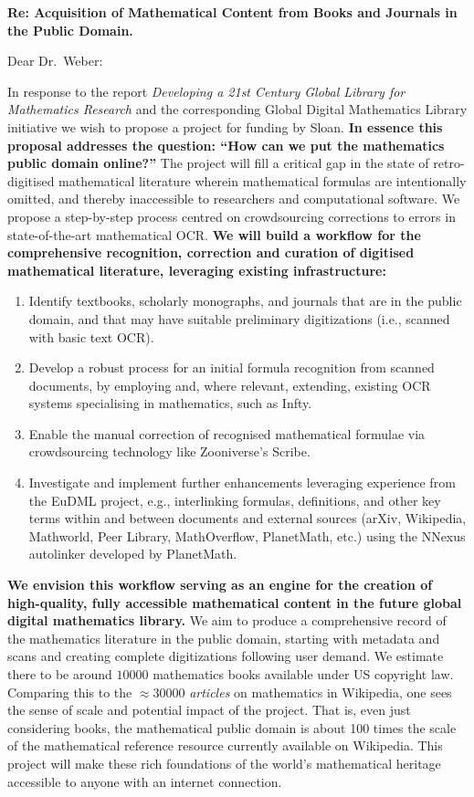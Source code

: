 \documentclass[10pt,letterpaper]{article}
\begin{document}
\thispagestyle{empty}

\noindent\textbf{Re: \quad Acquisition of Mathematical Content from Books and Journals in the Public Domain.}

\bigskip

\noindent Dear Dr.~Weber:

\bigskip

In response to the report \emph{Developing a 21st Century Global
  Library for Mathematics Research} and the corresponding Global
Digital Mathematics Library initiative we wish to propose a project
for funding by Sloan.  \textbf{In essence this proposal addresses the
  question: ``How can we put the mathematics public domain online?''}
The project will fill a critical gap in the state of retro-digitised
mathematical literature wherein mathematical formulas are
intentionally omitted, and thereby inaccessible to researchers and
computational software.  We propose a step-by-step process centred on
crowdsourcing corrections to errors in state-of-the-art mathematical
OCR.  \textbf{We will build a workflow for the comprehensive
  recognition, correction and curation of digitised mathematical
  literature, leveraging existing infrastructure:}
\begin{enumerate}
\item Identify textbooks, scholarly monographs, and journals that are
  in the public domain, and that may have suitable preliminary
  digitizations (i.e., scanned with basic text OCR).
\item Develop a robust process for an initial formula recognition from scanned 
documents, by employing and, where relevant, extending, existing OCR systems 
specialising in mathematics, such as {\sf Infty}.
\item Enable 
the manual correction of recognised mathematical formulae via crowdsourcing 
technology like Zooniverse's {\sf Scribe}.
\item Investigate and implement further enhancements leveraging
  experience from the EuDML project, e.g., interlinking formulas,
  definitions, and other key terms within and between documents and
  external sources (arXiv, Wikipedia, Mathworld, Peer Library,
  MathOverflow, PlanetMath, etc.) using the {\sf NNexus} autolinker
  developed by PlanetMath.
\end{enumerate}
\textbf{We envision this workflow serving as an engine for the
  creation of high-quality, fully accessible mathematical content in
  the future global digital mathematics library.}  We aim to produce a
comprehensive record of the mathematics literature in the public
domain, starting with metadata and scans and creating complete
digitizations following user demand.  We estimate there to be around
$10000$ mathematics books available under US copyright law.  Comparing
this to the $\approx$30000 \emph{articles} on mathematics in
Wikipedia, one sees the sense of scale and potential impact of the
project.  That is, even just considering books, the mathematical
public domain is about 100 times the scale of the mathematical
reference resource currently available on Wikipedia.  This project
will make these rich foundations of the world's mathematical heritage
accessible to anyone with an internet connection.
\end{document}
